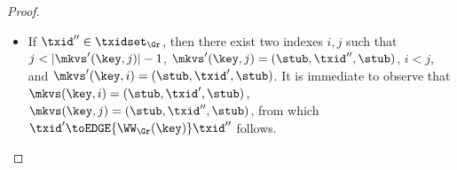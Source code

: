 \begin{proof}
\begin{enumerate}
\begin{itemize}
\begin{itemize}
\item If $\txid'' \in \txidset_{\Gr}$, then there exist two indexes $i,j$ such that 
$j < \lvert \mkvs'(\key, j) \rvert - 1$, $\mkvs'(\key, j) = (\stub, \txid'', \stub)$, 
$i < j$, and $\mkvs'(\key, i) = (\stub, \txid', \stub)$. It is immediate to observe 
that $\mkvs(\key, i) = (\stub, \txid', \stub)$, $\mkvs(\key, j) = (\stub, \txid'', \stub)$, 
from which $\txid' \toEDGE{\WW_{\Gr}(\key)} \txid''$ follows. 
\end{itemize}
\end{itemize}

\end{enumerate}
\end{proof}
